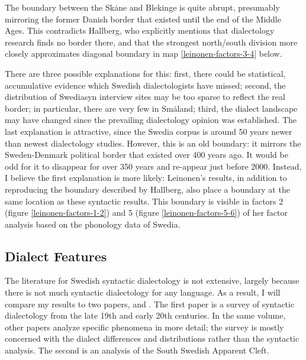 The boundary between the Sk\.ane and Blekinge is quite abrupt,
presumably mirroring the former Danish border that existed until the
end of the Middle Ages. This contradicts Hallberg, who explicitly
mentions that dialectology research finds no border there, and
that the strongest north/south division more closely approximates
 diagonal boundary in map
\ref{leinonen-factors-3-4} below.

There are three possible explanations for this: first, there could be
statistical, accumulative evidence which Swedish dialectologists have
missed; second, the distribution of Swediasyn interview sites may be
too sparse to reflect the real border; in particular, there are very
few in Sm\.aland; third, the dialect landscape may have changed since
the prevailing dialectology opinion was established.  The last
explanation is attractive, since the Swedia corpus is around 50 years
newer than newest dialectology studies. However, this is an old
boundary: it mirrors the Sweden-Denmark political border that existed
over 400 years ago. It would be odd for it to disappear for over 350
years and re-appear just before 2000. Instead, I believe the first
explanation is more likely: Leinonen's results, in addition to
reproducing the boundary described by Hallberg, also place a boundary
at the same location as these syntactic results. This boundary is
visible in factors 2 (figure \ref{leinonen-factors-1-2}) and 5 (figure
\ref{leinonen-factors-5-6}) of her factor analysis based on the
phonology data of Swedia.



\subsection{Dialect Features}

The literature for Swedish syntactic dialectology is not extensive,
largely because there is not much syntactic dialectology for any
language. As a result, I will compare my results to two papers,
 and . The first paper is a
survey of syntactic dialectology from the late 19th and early 20th
centuries. In the same volume, other papers analyze specific phenomena
in more detail; the survey is mostly concerned with the dialect differences
and distributions rather than the syntactic analysis. The second is an
analysis of the South Swedish Apparent Cleft.

